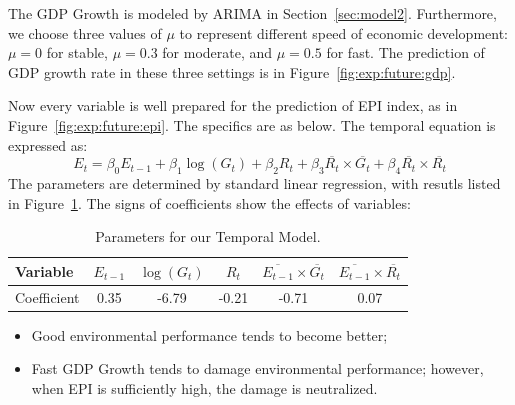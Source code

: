 The GDP Growth is modeled by ARIMA in Section~\ref{sec:model2}.
Furthermore, we choose three values of $\mu$ to represent different speed of economic development: $\mu=0$ for stable, $\mu=0.3$ for moderate, and $\mu=0.5$ for fast.
The prediction of GDP growth rate in these three settings is in Figure~\ref{fig:exp:future:gdp}.


    Now every variable is well prepared for the prediction of EPI index, as in Figure~\ref{fig:exp:future:epi}. The specifics are as below.
    The temporal equation is expressed as:
    \begin{equation}
       E_t = \beta_0 E_{t-1} + \beta_1 \log(G_t) + \beta_2 R_t + \beta_3 \overline{R_t}\times\overline{G_t} + \beta_4\overline{R_t}\times\overline{R_t}
       \label{eqn:exp:temporal:regression}
    \end{equation}
    The parameters are determined by standard linear regression, with resutls listed in Figure~\ref{tab:exp:temporal:params}. The signs of coefficients show the effects of variables:
    
    \begin{table}[htbp]
        \centering
        \begin{tabular}{|l|ccccc|} \hline
            Variable & $E_{t-1}$ & $\log(G_t)$ & $R_t$ & $\overline{E_{t-1}}\times\overline{G_t}$ & $\overline{E_{t-1}}\times\overline{R_t}$
            \\ \hline
            Coefficient & 0.35 & -6.79 & -0.21 & -0.71 & 0.07 
            \\ \hline
        \end{tabular}
        \caption{Parameters for our Temporal Model.}
        \label{tab:exp:temporal:params}
    \end{table}
    \begin{itemize}
       \item Good environmental performance tends to become better;
       \item Fast GDP Growth tends to damage environmental performance; however, when EPI is sufficiently high, the damage is neutralized.
    \end{itemize}


